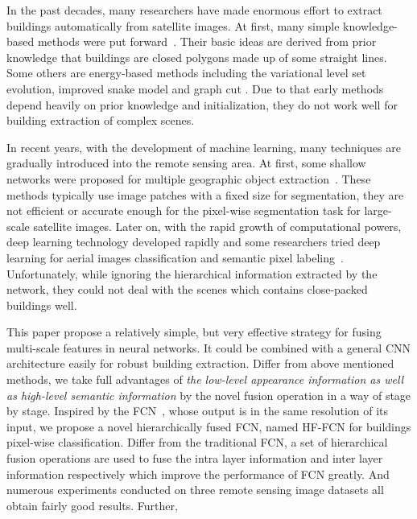In the past decades, many researchers have made enormous effort to extract buildings automatically from satellite images.
At first, many simple knowledge-based methods were put forward~\cite{IEEEexample:huertas1988detecting,IEEEexample:noronha2001detection,IEEEexample:nosrati2009novel, IEEEexample:izadi2012three,IEEEexample:wang2015efficient}.
Their basic ideas are derived from prior knowledge that buildings are closed polygons made up of some straight lines.
Some others are energy-based methods including the variational level set evolution, improved snake model and graph cut \cite{IEEEexample:cote2013automatic, IEEEexample:peng2005improved,IEEEexample:sirmacek2009urban}.
Due to that early methods depend heavily on prior knowledge and initialization, they do not work well for building extraction of complex scenes.


In recent years, with the development of machine learning, many  techniques are gradually introduced into the remote sensing area.
At first, some shallow networks were proposed for multiple geographic object extraction~\cite{IEEEexample:mnih2013machine, IEEEexample:saito2016multiple,IEEEexample:alshehhi2017simultaneous,IEEEexample:zhao2017contextually}.
These methods typically use image patches with a fixed size  for segmentation, they are not efficient or accurate enough for the pixel-wise segmentation task for large-scale satellite images.
%
Later on, with the rapid growth of computational powers, deep learning technology developed rapidly and some researchers tried deep learning for aerial images classification and semantic pixel labeling~\cite{IEEEexample:paisitkriangkrai2015effective,IEEEexample:liu2017dense,IEEEexample:audebert2017deep,IEEEexample:kampffmeyer2017urban,IEEEexample:he2017multi}.
Unfortunately, while ignoring the hierarchical information extracted by the network, they could not deal with the scenes which contains close-packed buildings well.



This paper propose a relatively simple, but very effective strategy for fusing
multi-scale features in neural networks.
It could be combined with a general CNN architecture easily for robust building extraction.
Differ from above mentioned methods, we take full advantages of \emph{the low-level appearance information as well as high-level semantic information} by the novel fusion operation in a way of stage by stage.
Inspired by the FCN~\cite{IEEEexample:Long_2015_CVPR}, whose output is in the same resolution of its input, we propose a novel hierarchically fused FCN, named HF-FCN for buildings pixel-wise classification.
Differ from the traditional FCN, a set of hierarchical fusion operations are used to fuse the intra layer information and inter layer information respectively which improve the performance of FCN greatly.
And numerous experiments conducted on three remote sensing image datasets all obtain fairly good results.
Further, 

